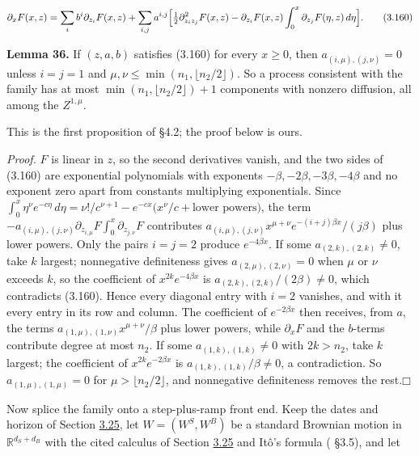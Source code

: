 \documentclass[11pt]{article}
\providecommand{\square}{\mdlgwhtsquare}
\begin{document}
\begin{equation*}
\partial_xF(x,z)=\sum_ib^i\partial_{z_i}F(x,z)+\sum_{i,j}a^{i,j}\Bigl[\tfrac12\partial^2_{z_iz_j}F(x,z)-\partial_{z_i}F(x,z)\int_0^x\partial_{z_j}F(\eta,z)\,d\eta\Bigr]. \tag{3.160}\label{eq:3.160}
\end{equation*}

\label{res:Lemma-36}
\textbf{Lemma 36.} If \((z,a,b)\) satisfies (3.160) for every \(x\ge0\), then \(a_{(i,\mu),(j,\nu)}=0\) unless \(i=j=1\) and \(\mu,\nu\le\min(n_1,\lfloor n_2/2\rfloor)\). So a process consistent with the family has at most \(\min(n_1,\lfloor n_2/2\rfloor)+1\) components with nonzero diffusion, all among the \(Z^{1,\mu}\).

This is the first proposition of \cite{sharef2004conditions} §4.2; the proof below is ours.

\emph{Proof.} \(F\) is linear in \(z\), so the second derivatives vanish, and the two sides of (3.160) are exponential polynomials with exponents \(-\beta,-2\beta,-3\beta,-4\beta\) and no exponent zero apart from constants multiplying exponentials. Since \(\int_0^x\eta^\nu e^{-c\eta}\,d\eta=\nu!/c^{\nu+1}-e^{-cx}\bigl(x^\nu/c+\text{lower powers}\bigr)\), the term \(-a_{(i,\mu),(j,\nu)}\partial_{z_{i,\mu}}F\int_0^x\partial_{z_{j,\nu}}F\) contributes \(a_{(i,\mu),(j,\nu)}x^{\mu+\nu}e^{-(i+j)\beta x}/(j\beta)\) plus lower powers. Only the pairs \(i=j=2\) produce \(e^{-4\beta x}\). If some \(a_{(2,k),(2,k)}\neq0\), take \(k\) largest; nonnegative definiteness gives \(a_{(2,\mu),(2,\nu)}=0\) when \(\mu\) or \(\nu\) exceeds \(k\), so the coefficient of \(x^{2k}e^{-4\beta x}\) is \(a_{(2,k),(2,k)}/(2\beta)\neq0\), which contradicts (3.160). Hence every diagonal entry with \(i=2\) vanishes, and with it every entry in its row and column. The coefficient of \(e^{-2\beta x}\) then receives, from \(a\), the terms \(a_{(1,\mu),(1,\nu)}x^{\mu+\nu}/\beta\) plus lower powers, while \(\partial_xF\) and the \(b\)-terms contribute degree at most \(n_2\). If some \(a_{(1,k),(1,k)}\neq0\) with \(2k>n_2\), take \(k\) largest; the coefficient of \(x^{2k}e^{-2\beta x}\) is \(a_{(1,k),(1,k)}/\beta\neq0\), a contradiction. So \(a_{(1,\mu),(1,\mu)}=0\) for \(\mu>\lfloor n_2/2\rfloor\), and nonnegative definiteness removes the rest.\hfill$\square$

Now splice the family onto a step-plus-ramp front end. Keep the dates and horizon of Section \hyperref[sec:3.25]{3.25}, let \(W=(W^S,W^B)\) be a standard Brownian motion in \(\mathbb R^{d_S+d_B}\) with the cited calculus of Section \hyperref[sec:3.25]{3.25} and Itô's formula (\cite{bauerschmidt2020stochastic} §3.5), and let
\end{document}
